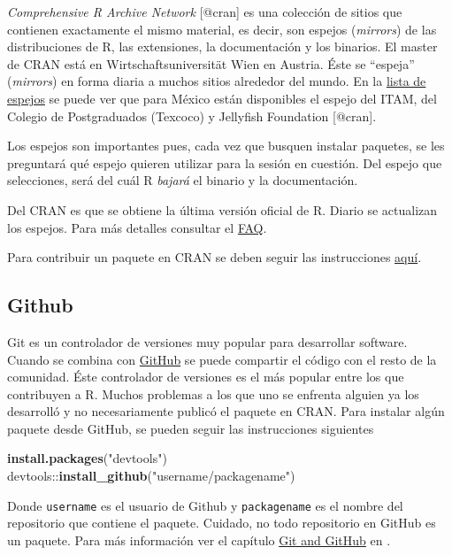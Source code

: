 \documentclass[]{article}
\newenvironment{Shaded}{\begin{snugshade}}{\end{snugshade}}
\newcommand{\KeywordTok}[1]{\textcolor[rgb]{0.13,0.29,0.53}{\textbf{{#1}}}}
\newcommand{\StringTok}[1]{\textcolor[rgb]{0.31,0.60,0.02}{{#1}}}
\newcommand{\NormalTok}[1]{{#1}}
\begin{document}
\emph{Comprehensive R Archive Network} {[}@cran{]} es una colección de
sitios que contienen exactamente el mismo material, es decir, son
espejos (\emph{mirrors}) de las distribuciones de R, las extensiones, la
documentación y los binarios. El master de CRAN está en
Wirtschaftsuniversität Wien en Austria. Éste se ``espeja''
(\emph{mirrors}) en forma diaria a muchos sitios alrededor del mundo. En
la \href{https://cran.r-project.org/mirrors.html}{lista de espejos} se
puede ver que para México están disponibles el espejo del ITAM, del
Colegio de Postgraduados (Texcoco) y Jellyfish Foundation {[}@cran{]}.

Los espejos son importantes pues, cada vez que busquen instalar
paquetes, se les preguntará qué espejo quieren utilizar para la sesión
en cuestión. Del espejo que selecciones, será del cuál R \emph{bajará}
el binario y la documentación.

Del CRAN es que se obtiene la última versión oficial de R. Diario se
actualizan los espejos. Para más detalles consultar el
\href{https://cran.r-project.org/doc/FAQ/R-FAQ.html}{FAQ}.

Para contribuir un paquete en CRAN se deben seguir las instrucciones
\href{https://cran.r-project.org/web/packages/policies.html}{aquí}.

\subsection{Github}\label{github}

Git es un controlador de versiones muy popular para desarrollar
software. Cuando se combina con \href{https://github.com/}{GitHub} se
puede compartir el código con el resto de la comunidad. Éste controlador
de versiones es el más popular entre los que contribuyen a R. Muchos
problemas a los que uno se enfrenta alguien ya los desarrolló y no
necesariamente publicó el paquete en CRAN. Para instalar algún paquete
desde GitHub, se pueden seguir las instrucciones siguientes

\begin{Shaded}
\begin{Highlighting}[]
\KeywordTok{install.packages}\NormalTok{(}\StringTok{"devtools"}\NormalTok{)}
\NormalTok{devtools::}\KeywordTok{install_github}\NormalTok{(}\StringTok{"username/packagename"}\NormalTok{)}
\end{Highlighting}
\end{Shaded}

Donde \texttt{username} es el usuario de Github y \texttt{packagename}
es el nombre del repositorio que contiene el paquete. Cuidado, no todo
repositorio en GitHub es un paquete. Para más información ver el
capítulo \href{http://r-pkgs.had.co.nz/git.html}{Git and GitHub} en
\textcite{wickham2015r}.
\end{document}
